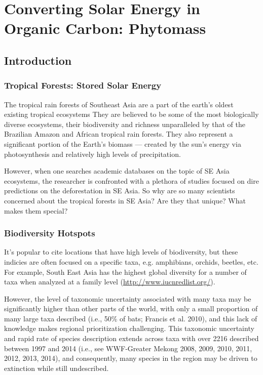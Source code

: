\chapter{Converting Solar Energy in Organic Carbon: Phytomass}

\section{Introduction}

\subsection{Tropical Forests: Stored Solar Energy}

The tropical rain forests of Southeast Asia are a part of the earth's oldest existing tropical ecosystems They are believed to be some of the most biologically diverse ecosystems, their biodiversity and richness unparalleled by that of the Brazilian Amazon and African tropical rain forests. They also represent a significant portion of the Earth's biomass --- created by the sun's energy via photosynthesis and relatively high levels of precipitation.

However, when one searches academic databases on the topic of SE Asia ecosystems, the researcher is confronted with a plethora of studies focused on dire predictions on the deforestation in SE Asia. So why are so many scientists concerned about the tropical forests in SE Asia? Are they that unique?  What makes them special?

\subsection{Biodiversity Hotspots}

It's popular to cite locations that have high levels of biodiversity, but these indicies are often focused on a specific taxa, e.g. amphibians, orchids, beetles, etc. For example, South East Asia has the highest global diversity for a number of taxa when analyzed at a family level (\url{http://www.iucnredlist.org/}). 

However, the level of taxonomic uncertainty associated with many taxa may be significantly higher than other parts of the world, with only a small proportion of many large taxa described (i.e., 50\% of bats; Francis et al. 2010), and this lack of knowledge makes regional prioritization challenging. This taxonomic uncertainty and rapid rate of species description extends across taxa with over 2216 described between 1997 and 2014 (i.e., see WWF‐Greater Mekong 2008, 2009, 2010, 2011, 2012, 2013, 2014), and consequently, many species in the region may be driven to extinction while still undescribed.


